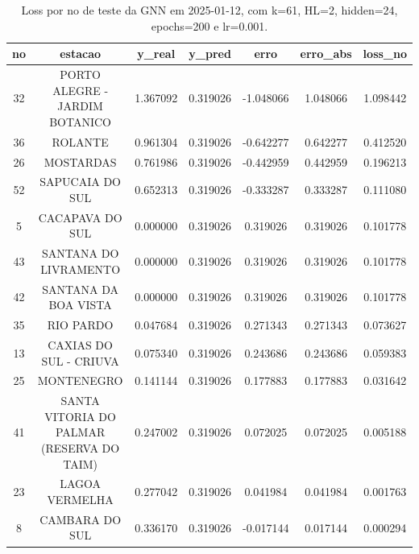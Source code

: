 \begin{table}[h]
\centering
\caption{Loss por no de teste da GNN em 2025-01-12, com k=61, HL=2, hidden=24, epochs=200 e lr=0.001.}
\label{tab:gnn_loss_k61_hl2_h24_e200_d20250112}
\begin{tabular}{ccccccc}
\toprule
no & estacao & y\_real & y\_pred & erro & erro\_abs & loss\_no \\
\midrule
32 & PORTO ALEGRE - JARDIM BOTANICO & 1.367092 & 0.319026 & -1.048066 & 1.048066 & 1.098442 \\
36 & ROLANTE & 0.961304 & 0.319026 & -0.642277 & 0.642277 & 0.412520 \\
26 & MOSTARDAS & 0.761986 & 0.319026 & -0.442959 & 0.442959 & 0.196213 \\
52 & SAPUCAIA DO SUL & 0.652313 & 0.319026 & -0.333287 & 0.333287 & 0.111080 \\
5 & CACAPAVA DO SUL & 0.000000 & 0.319026 & 0.319026 & 0.319026 & 0.101778 \\
43 & SANTANA DO LIVRAMENTO & 0.000000 & 0.319026 & 0.319026 & 0.319026 & 0.101778 \\
42 & SANTANA DA BOA VISTA & 0.000000 & 0.319026 & 0.319026 & 0.319026 & 0.101778 \\
35 & RIO PARDO & 0.047684 & 0.319026 & 0.271343 & 0.271343 & 0.073627 \\
13 & CAXIAS DO SUL - CRIUVA & 0.075340 & 0.319026 & 0.243686 & 0.243686 & 0.059383 \\
25 & MONTENEGRO & 0.141144 & 0.319026 & 0.177883 & 0.177883 & 0.031642 \\
41 & SANTA VITORIA DO PALMAR (RESERVA DO TAIM) & 0.247002 & 0.319026 & 0.072025 & 0.072025 & 0.005188 \\
23 & LAGOA VERMELHA & 0.277042 & 0.319026 & 0.041984 & 0.041984 & 0.001763 \\
8 & CAMBARA DO SUL & 0.336170 & 0.319026 & -0.017144 & 0.017144 & 0.000294 \\
\bottomrule
\end{tabular}
\end{table}
